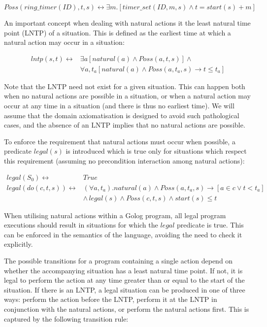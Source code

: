 \documentclass{llncs}
\begin{document}
\[
Poss(ring\_ timer(ID),t,s)\leftrightarrow\exists m.\left[timer\_ set(ID,m,s)\wedge t=start(s)+m\right]
\]


An important concept when dealing with natural actions it the least
natural time point (LNTP) of a situation. This is defined as the earliest
time at which a natural action may occur in a situation:

\begin{align*}
lntp(s,t)\leftrightarrow & \exists a\left[natural(a)\wedge Poss(a,t,s)\right]\wedge\\
 & \forall a,t_{a}\left[natural(a)\wedge Poss(a,t_{a},s)\rightarrow t\leq t_{a}\right]
\end{align*}


Note that the LNTP need not exist for a given situation. This can
happen both when no natural actions are possible in a situation, or
when a natural action may occur at any time in a situation (and there
is thus no earliest time). We will assume that the domain axiomatisation
is designed to avoid such pathological cases, and the absence of an
LNTP implies that no natural actions are possible.

To enforce the requirement that natural actions must occur when possible,
a predicate $legal(s)$ is introduced which is true only for situations
which respect this requirement (assuming no precondition interaction
among natural actions):

\begin{align*}
legal(S_{0}) \leftrightarrow & True\\
legal(do(c,t,s)) \leftrightarrow & (\forall a,t_{a}).natural(a)\wedge Poss(a,t_{a},s)\rightarrow\left[a\in c\vee t<t_{a}\right]\\
 & \wedge\, legal(s)\wedge Poss(c,t,s)\wedge start(s)\leq t
\end{align*}


When utilising natural actions within a Golog program, all legal program
executions should result in situations for which the $legal$ predicate
is true. This can be enforced in the semantics of the language, avoiding
the need to check it explicitly.

The possible transitions for a program containing a single action
depend on whether the accompanying situation has a least natural time
point. If not, it is legal to perform the action at any time greater
than or equal to the start of the situation. If there is an LNTP,
a legal situation can be produced in one of three ways: perform the
action before the LNTP, perform it at the LNTP in conjunction with
the natural actions, or perform the natural actions first. This is
captured by the following transition rule:
\end{document}
